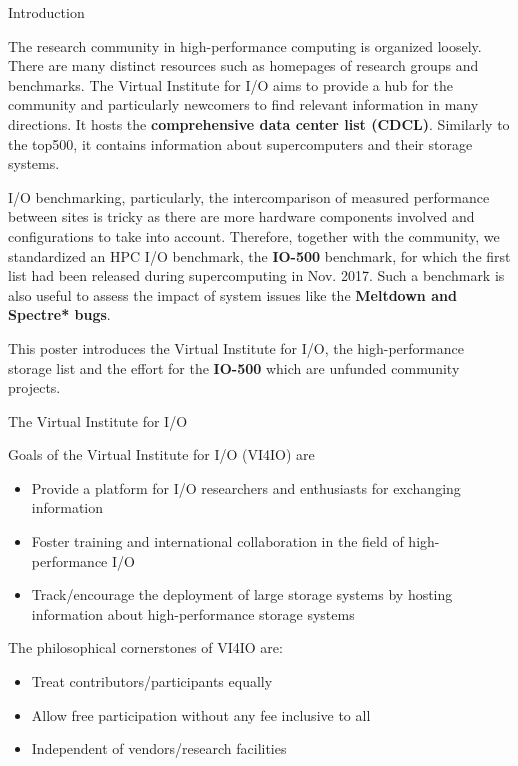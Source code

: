 \documentclass[portrait,a0paper,fontscale=0.4]{baposter}
\newcommand{\compresslist}{%
\setlength{\itemsep}{1pt}%
\setlength{\parskip}{0pt}%
\setlength{\parsep}{0pt}%
}
\begin{document}
\begin{poster}
\begin{posterbox}[name=problem,column=0]
{Introduction}

The research community in high-performance computing is organized loosely.
There are many distinct resources such as homepages of research groups and benchmarks.
The Virtual Institute for I/O aims to provide a hub for the community and particularly newcomers to find relevant information in many directions.
It hosts the \textbf{comprehensive data center list (CDCL)}. Similarly to the top500, it contains information about supercomputers and their storage systems.

I/O benchmarking, particularly, the intercomparison of measured performance between sites is tricky as there are more hardware components involved and configurations to take into account.
Therefore, together with the community, we standardized an HPC I/O benchmark, the \textbf{IO-500} benchmark, for which the first list had been released during supercomputing in Nov. 2017.
Such a benchmark is also useful to assess the impact of system issues like the \textbf{Meltdown and Spectre* bugs}.%

This poster introduces the Virtual Institute for I/O, the high-performance storage list and the effort for the \textbf{IO-500} which are unfunded community projects.
\end{posterbox}


\begin{posterbox}[name=approach,column=0,below=problem]
{The Virtual Institute for I/O}


Goals of the Virtual Institute for I/O (VI4IO) are
\vspace*{-1em}
\begin{itemize}\compresslist
\item Provide a platform for I/O researchers and enthusiasts for exchanging information
\item Foster training and international collaboration in the field of high-performance I/O
\item Track/encourage the deployment of large storage systems by hosting information about high-performance storage systems
\end{itemize}
\vspace*{-1em}

The philosophical cornerstones of VI4IO are:

\vspace*{-1em}
\begin{itemize}\compresslist
\item Treat contributors/participants equally
\item Allow free participation without any fee inclusive to all
\item Independent of vendors/research facilities
\end{itemize}
\end{posterbox}



\end{poster}
\end{document}

